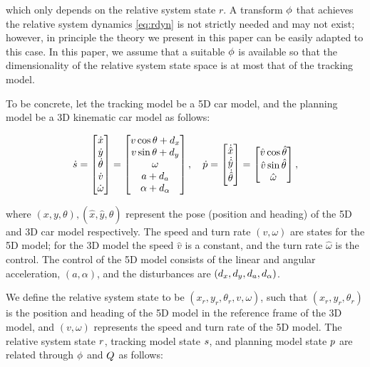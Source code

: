 \noindent which only depends on the relative system state $r$.
A transform $\phi$ that achieves the relative system dynamics \eqref{eq:rdyn} is not strictly needed and may not exist; however, in principle the theory we present in this paper can be easily adapted to this case.
In this paper, we assume that a suitable $\phi$ is available so that the dimensionality of the relative system state space is at most that of the tracking model.

To be concrete, let the tracking model be a 5D car model, and the planning model be a 3D kinematic car model as follows:

\begin{equation}
\label{eq:5D_and_3D_dyn}
\dot \tstate = 
\begin{bmatrix}
\dot x\\
\dot y\\
\dot\theta\\
\dot v\\
\dot \omega
\end{bmatrix} =
\begin{bmatrix}
v \cos \theta + \dstb_x\\
v \sin \theta + \dstb_y\\
\omega \\
a + \dstb_a\\
\alpha + \dstb_\alpha
\end{bmatrix}, \quad
\dot \pstate = 
\begin{bmatrix}
\dot {\hat x}\\
\dot {\hat y}\\
\dot {\hat \theta}
\end{bmatrix}
=
\begin{bmatrix}
\hat v \cos \hat\theta\\
\hat v \sin \hat\theta\\
\hat \omega
\end{bmatrix},
\end{equation}

\noindent where $(x,y,\theta),(\hat x, \hat y, \hat\theta)$ represent the pose (position and heading) of the 5D and 3D car model respectively.
The speed and turn rate $(v, \omega)$ are states for the 5D model; for the 3D model the speed $\hat v$ is a constant, and the turn rate $\hat \omega$ is the control.
The control of the 5D model consists of the linear and angular acceleration, $(a, \alpha)$, and the disturbances are $(d_x, d_y, d_a, d_\alpha)$.

We define the relative system state to be $(x_r, y_r, \theta_r, v, \omega)$, such that $(x_r, y_r, \theta_r)$ is the position and heading of the 5D model in the reference frame of the 3D model, and $(v, \omega)$ represents the speed and turn rate of the 5D model.
The relative system state $r$, tracking model state $s$, and planning model state $p$ are related through $\phi$ and $Q$ as follows:

